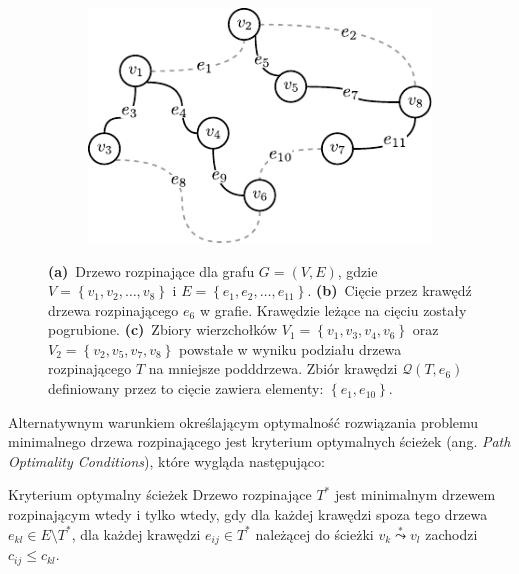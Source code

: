 \begin{figure}[!htbp]
\begin{subfigure}[b]{0.32\textwidth}
		\includegraphics[width=\textwidth]{Chapter_I/CUT-example/c}
		\caption{}
		\label{fig:cut:c}
	\end{subfigure}
	\hfill\null
	\caption{
		\textbf{(a)}~Drzewo rozpinające dla grafu $G = \left( V, E \right)$, gdzie $V = \left\{ v_{1}, v_{2}, \dots, v_{8} \right\}$ i $E = \left\{ e_{1}, e_{2}, \dots, e_{11} \right\}$.
		\textbf{(b)}~Cięcie przez krawędź drzewa rozpinającego $e_{6}$ w grafie. Krawędzie leżące na cięciu zostały pogrubione.
		\textbf{(c)}~Zbiory wierzchołków $V_{1} = \left\{ v_{1}, v_{3}, v_{4}, v_{6} \right\}$ oraz $V_{2} = \left\{ v_{2}, v_{5}, v_{7}, v_{8} \right\}$ powstałe w wyniku podziału drzewa rozpinającego $T$ na mniejsze podddrzewa. Zbiór krawędzi $\mathcal{Q} \left( T, e_{6} \right)$ definiowany przez to cięcie zawiera elementy: $\left\{ e_{1}, e_{10} \right\}$.
	}
	\label{fig:cut}
\end{figure}

Alternatywnym warunkiem określającym optymalność rozwiązania problemu minimalnego drzewa rozpinającego jest kryterium optymalnych ścieżek (ang. \textit{Path Optimality Conditions}), które wygląda następująco:

\begin{theorem}{Kryterium optymalny ścieżek}\label{def:optpath}
	Drzewo rozpinające $T^{\ast}$ jest minimalnym drzewem rozpinającym wtedy i tylko wtedy, gdy dla każdej krawędzi spoza tego drzewa $e_{kl} \in E \setminus T^{\ast}$, dla każdej krawędzi $e_{ij} \in T^{\ast}$ należącej do ścieżki $v_{k} \overset{\ast}{\leadsto} v_{l}$ zachodzi $c_{ij} \leqslant c_{kl}$.
\end{theorem}

